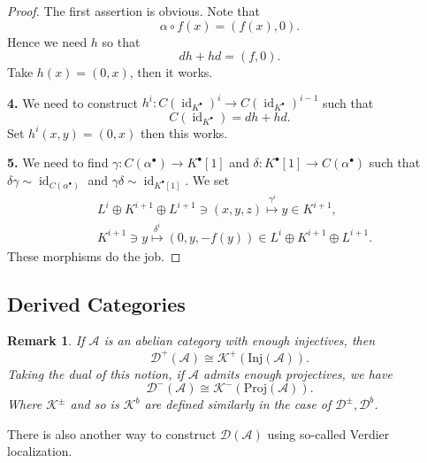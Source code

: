 \documentclass[10pt]{article}
\numberwithin{equation}{section}
\newtheorem{remark}{Remark}[section]
\DeclareMathOperator{\id}{id}
\newcommand{\cK}[0]{\mathcal{K}}
\newcommand{\cD}[0]{\mathcal{D}}
\newcommand{\sA}[0]{\mathscr{A}}
\begin{document}
\begin{proof}
    The first assertion is obvious. Note that 
    \begin{equation*}
        \alpha\circ f(x) = (f(x),0).
    \end{equation*}
    Hence we need $h$ so that 
    \begin{equation*}
        dh+hd = (f,0).
    \end{equation*}
    Take $h(x) = (0,x)$, then it works.
    \par\textbf{4.} We need to construct $h^i:C(\id_{K^\bullet})^i\to C(\id_{K^\bullet})^{i-1}$ such that 
    \begin{equation*}
        C(\id_{K^\bullet}) = dh+hd.
    \end{equation*}
    Set $h^i(x,y) = (0,x)$ then this works.
    \par\textbf{5.} We need to find $\gamma:C(\alpha^\bullet)\to K^\bullet[1]$ and $\delta:K^\bullet[1]\to C(\alpha^\bullet)$ such that $\delta\gamma\sim\id_{C(\alpha^\bullet)}$ and $\gamma\delta\sim\id_{K^\bullet[1]}$. 
    We set
    \begin{align*}
        &L^i\oplus K^{i+1}\oplus L^{i+1}\ni(x,y,z)\stackrel{\gamma^i}{\mapsto} y\in K^{i+1},\\
        &K^{i+1}\ni y\stackrel{\delta^i}{\mapsto}(0,y,-f(y))\in L^i\oplus K^{i+1}\oplus L^{i+1}.
    \end{align*}
    These morphisms do the job.
\end{proof}

\subsection{Derived Categories}
\begin{remark}
    If $\sA$ is an abelian category with enough injectives, then 
    \begin{equation*}
        \mathcal{D}^+(\sA)\cong \cK^+(\mathrm{Inj}(\sA)).
    \end{equation*}
    Taking the dual of this notion, if $\sA$ admits enough projectives, we have 
    \begin{equation*}
        \mathcal{D}^-(\sA)\cong \cK^-(\mathrm{Proj}(\sA)).
    \end{equation*}
    Where $\cK^\pm$ and so is $\cK^b$ are defined similarly in the case of $\cD^\pm,\cD^b$.
\end{remark}

There is also another way to construct $\cD(\sA)$ using so-called Verdier localization.
\end{document}
